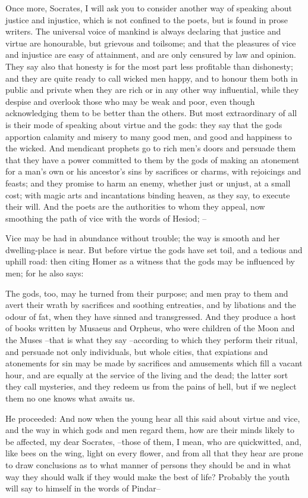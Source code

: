 Once more, Socrates, I will ask you to consider another way of speaking about justice and injustice, which is not confined to the poets, but is found in prose writers. The universal voice of mankind is always declaring that justice and virtue are honourable, but grievous and toilsome; and that the pleasures of vice and injustice are easy of attainment, and are only censured by law and opinion. They say also that honesty is for the most part less profitable than dishonesty; and they are quite ready to call wicked men happy, and to honour them both in public and private when they are rich or in any other way influential, while they despise and overlook those who may be weak and poor, even though acknowledging them to be better than the others. But most extraordinary of all is their mode of speaking about virtue and the gods: they say that the gods apportion calamity and misery to many good men, and good and happiness to the wicked. And mendicant prophets go to rich men's doors and persuade them that they have a power committed to them by the gods of making an atonement for a man's own or his ancestor's sins by sacrifices or charms, with rejoicings and feasts; and they promise to harm an enemy, whether just or unjust, at a small cost; with magic arts and incantations binding heaven, as they say, to execute their will. And the poets are the authorities to whom they appeal, now smoothing the path of vice with the words of Hesiod; --

Vice may be had in abundance without trouble; the way is smooth and her dwelling-place is near. But before virtue the gods have set toil, and a tedious and uphill road: then citing Homer as a witness that the gods may be influenced by men; for he also says:

The gods, too, may he turned from their purpose; and men pray to them and avert their wrath by sacrifices and soothing entreaties, and by libations and the odour of fat, when they have sinned and transgressed. And they produce a host of books written by Musaeus and Orpheus, who were children of the Moon and the Muses --that is what they say --according to which they perform their ritual, and persuade not only individuals, but whole cities, that expiations and atonements for sin may be made by sacrifices and amusements which fill a vacant hour, and are equally at the service of the living and the dead; the latter sort they call mysteries, and they redeem us from the pains of hell, but if we neglect them no one knows what awaits us.

He proceeded: And now when the young hear all this said about virtue and vice, and the way in which gods and men regard them, how are their minds likely to be affected, my dear Socrates, --those of them, I mean, who are quickwitted, and, like bees on the wing, light on every flower, and from all that they hear are prone to draw conclusions as to what manner of persons they should be and in what way they should walk if they would make the best of life? Probably the youth will say to himself in the words of Pindar--

